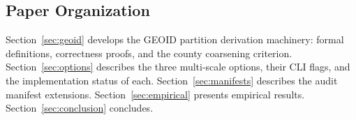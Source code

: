 \subsection{Paper Organization}

Section~\ref{sec:geoid} develops the GEOID partition derivation machinery:
formal definitions, correctness proofs, and the county coarsening criterion.
Section~\ref{sec:options} describes the three multi-scale options, their
CLI flags, and the implementation status of each.
Section~\ref{sec:manifests} describes the audit manifest extensions.
Section~\ref{sec:empirical} presents empirical results.
Section~\ref{sec:conclusion} concludes.
